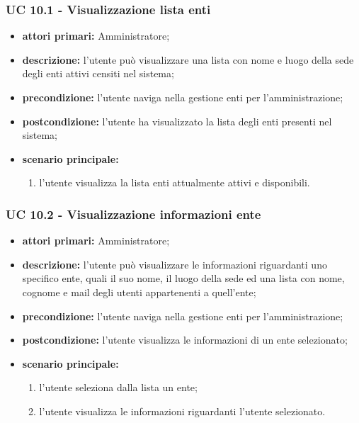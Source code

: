 			\subsubsection{UC 10.1 - Visualizzazione lista enti }
			\begin{itemize}
				\item \textbf{attori primari:} Amministratore;
				\item \textbf{descrizione:} l'utente può visualizzare una lista con nome e luogo della sede degli enti attivi censiti nel sistema;
				\item \textbf{precondizione:} l'utente naviga nella gestione enti per l'amministrazione;
				\item \textbf{postcondizione:} l'utente ha visualizzato la lista degli enti presenti nel sistema;
				\item \textbf{scenario principale:}
				\begin{enumerate}
					\item{l'utente visualizza la lista enti attualmente attivi e disponibili.}
				\end{enumerate}	
			\end{itemize}

			\subsubsection{UC 10.2 - Visualizzazione informazioni ente}
			\begin{itemize}
				\item \textbf{attori primari:} Amministratore;
				\item \textbf{descrizione:} l'utente può visualizzare le informazioni riguardanti uno specifico ente, quali il suo nome, il luogo della sede ed una lista con nome, cognome e mail degli utenti appartenenti a quell'ente;
				\item \textbf{precondizione:} l'utente naviga nella gestione enti per l'amministrazione;
				\item \textbf{postcondizione:} l'utente visualizza le informazioni di un ente selezionato;
				\item \textbf{scenario principale:}
				\begin{enumerate}
					\item{l'utente seleziona dalla lista un ente;}
					\item{l'utente visualizza le informazioni riguardanti l'utente selezionato.}
				\end{enumerate}	
			\end{itemize}

